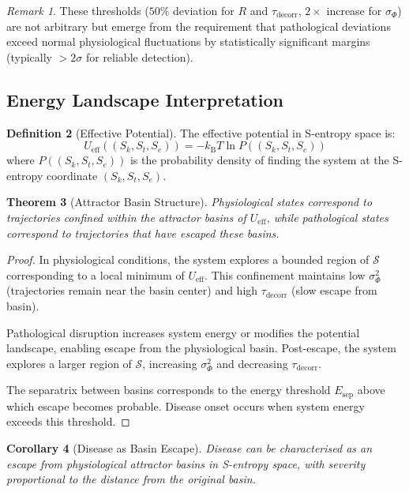 \documentclass[11pt,twocolumn,a4paper]{article}
\newtheorem{theorem}{Theorem}[section]
\newtheorem{corollary}[theorem]{Corollary}
\theoremstyle{definition}
\newtheorem{definition}[theorem]{Definition}
\theoremstyle{remark}
\newtheorem{remark}[theorem]{Remark}
\newcommand{\kB}{k_{\mathrm{B}}}
\newcommand{\Sspace}{\mathcal{S}}
\newcommand{\Scoord}{(\Sk,\St,\Se)}
\newcommand{\Sk}{S_k}
\newcommand{\St}{S_t}
\newcommand{\Se}{S_e}
\newcommand{\taudecorr}{\tau_{\mathrm{decorr}}}
\begin{document}
\begin{remark}
These thresholds ($50\%$ deviation for $R$ and $\taudecorr$, $2\times$ increase for $\sigma_\Phi$) are not arbitrary but emerge from the requirement that pathological deviations exceed normal physiological fluctuations by statistically significant margins (typically $> 2\sigma$ for reliable detection).
\end{remark}


\subsection{Energy Landscape Interpretation}

\begin{definition}[Effective Potential]
\label{def:effective_potential}
The effective potential in S-entropy space is:
\begin{equation}
U_{\mathrm{eff}}(\Scoord) = -\kB T \ln P(\Scoord)
\label{eq:effective_potential}
\end{equation}
where $P(\Scoord)$ is the probability density of finding the system at the S-entropy coordinate $\Scoord$.
\end{definition}

\begin{theorem}[Attractor Basin Structure]
\label{thm:attractor_basin}
Physiological states correspond to trajectories confined within the attractor basins of $U_{\mathrm{eff}}$, while pathological states correspond to trajectories that have escaped these basins.
\end{theorem}

\begin{proof}
In physiological conditions, the system explores a bounded region of $\Sspace$ corresponding to a local minimum of $U_{\mathrm{eff}}$. This confinement maintains low $\sigma_\Phi^2$ (trajectories remain near the basin center) and high $\taudecorr$ (slow escape from basin).

Pathological disruption increases system energy or modifies the potential landscape, enabling escape from the physiological basin. Post-escape, the system explores a larger region of $\Sspace$, increasing $\sigma_\Phi^2$ and decreasing $\taudecorr$.

The separatrix between basins corresponds to the energy threshold $E_{\mathrm{sep}}$ above which escape becomes probable. Disease onset occurs when system energy exceeds this threshold.
\end{proof}

\begin{corollary}[Disease as Basin Escape]
\label{cor:disease_basin_escape}
Disease can be characterised as an escape from physiological attractor basins in S-entropy space, with severity proportional to the distance from the original basin.
\end{corollary}
\end{document}
